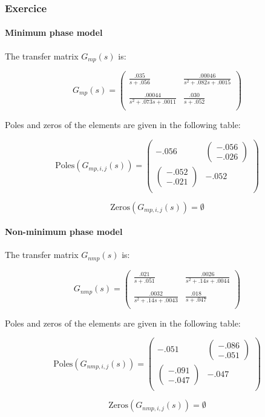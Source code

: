 \subsubsection{Exercice}
\paragraph{Minimum phase model}

The transfer matrix $G_{mp}(s)$ is:

$$G_{mp}(s) = \left(\begin{array}{cc} 
    \frac{.035}{s + .056} & \frac{.00046}{s^2 + .082 s + .0015} \\
    \\
    \frac{ .00044}{  s^2 + .073 s + .0011} & \frac{.030}{s + .052} \\
\end{array}\right)$$


Poles and zeros of the elements are given in the following table:

$$
\text{Poles}(G_{mp,i,j}(s)) = \left(\begin{array}{cc} -.056 & \left(\begin{array}{c} -.056\\ -.026 \end{array}\right) \\ \left(\begin{array}{c} -.052\\ -.021 \end{array}\right) & -.052 \\ \end{array}\right)
$$

$$\text{Zeros}(G_{mp,i,j}(s)) = \emptyset $$

\paragraph{Non-minimum phase model}

The transfer matrix $G_{nmp}(s)$ is:

$$G_{nmp}(s) = \left(\begin{array}{cc} 
    \frac{.021}{s + .051} & \frac{.0026}{s^2 + .14 s + .0044} \\
    \\
    \frac{ .0032}{ s^2 + .14 s + .0043} & \frac{.018}{s + .047} \\
\end{array}\right)$$

Poles and zeros of the elements are given in the following table:


$$\text{Poles}(G_{nmp,i,j}(s)) = 
\left(\begin{array}{cc} -.051 & \left(\begin{array}{c} -.086\\ -.051 \end{array}\right) \\ \left(\begin{array}{c} -.091\\ -.047 \end{array}\right) & -.047 \\ \end{array}\right)
$$

$$\text{Zeros}(G_{nmp,i,j}(s)) = \emptyset $$
